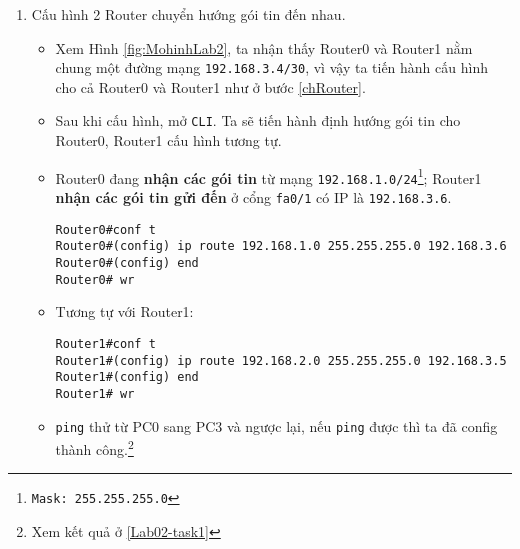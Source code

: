 \documentclass[]{article}
\begin{document}
\begin{enumerate}
\begin{itemize}
\begin{lstlisting}
\end{lstlisting}
\item Sau đó, đặt Router mặc định cho mạng \texttt{192.168.1.0/24}:
\begin{lstlisting}
Router0#(config-if) default-router 192.168.1.1
\end{lstlisting}
\item Cuối cùng, đặt trạng thái cho cổng \texttt{fa0/0} luôn mở và ghi lại các thay đổi của Router.
\begin{lstlisting}
Router0#(config-if) no shutdown
Router0#(config-if) end
Router0# wr
\end{lstlisting}
\end{itemize}
Kết thúc bước này, các máy tính trong mạng \texttt{192.168.1.0/24} đã có thể \texttt{ping} cho nhau.
\begin{figure}[H]
    \centering
    \texttt{[image: lab2/Lab02-hinh3.png]}
    \caption{PC0 đã ping thành công cho PC1}
\end{figure}
\item Cấu hình 2 Router chuyển hướng gói tin đến nhau.\label{chRouting}
\begin{itemize}
\item Xem Hình \ref{fig:MohinhLab2}, ta nhận thấy Router0 và Router1 nằm chung một đường mạng \texttt{192.168.3.4/30}, vì vậy ta tiến hành cấu hình cho cả Router0 và Router1 như ở bước \ref{chRouter}.
\item Sau khi cấu hình, mở \texttt{CLI}. Ta sẽ tiến hành định hướng gói tin cho Router0, Router1 cấu hình tương tự.
\item Router0 đang \textbf{nhận các gói tin} từ mạng \texttt{192.168.1.0/24\footnote{Mask: 255.255.255.0}}; Router1 \textbf{nhận các gói tin gửi đến} ở cổng \texttt{fa0/1} có IP là \texttt{192.168.3.6}.
\begin{lstlisting}
Router0#conf t
Router0#(config) ip route 192.168.1.0 255.255.255.0 192.168.3.6
Router0#(config) end
Router0# wr
\end{lstlisting}
\item Tương tự với Router1:
\begin{lstlisting}
Router1#conf t
Router1#(config) ip route 192.168.2.0 255.255.255.0 192.168.3.5
Router1#(config) end
Router1# wr
\end{lstlisting}
\item \texttt{ping} thử từ PC0 sang PC3 và ngược lại, nếu \texttt{ping} được thì ta đã config thành công.\footnote{Xem kết quả ở \ref{Lab02-task1}}
\end{itemize}
\end{enumerate}
\end{document}
